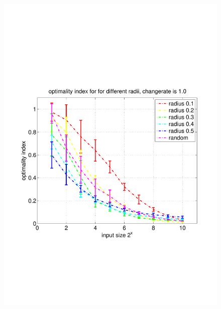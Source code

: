 \documentclass[11pt]{article}
\begin{document}
\begin{figure}
	\includegraphics[width=\linewidth]{../../code/data/2014_12_12_00_55_41/figure_3}
\end{figure}
\end{document}
